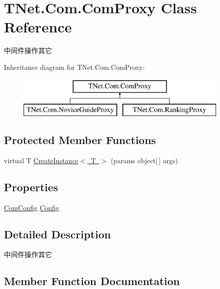 \hypertarget{class_t_net_1_1_com_1_1_com_proxy}{}\section{T\+Net.\+Com.\+Com\+Proxy Class Reference}
\label{class_t_net_1_1_com_1_1_com_proxy}


中间件操作其它  


Inheritance diagram for T\+Net.\+Com.\+Com\+Proxy\+:\begin{figure}[H]
\begin{center}
\leavevmode
\includegraphics[height=2.000000cm]{class_t_net_1_1_com_1_1_com_proxy}
\end{center}
\end{figure}
\subsection*{Protected Member Functions}
\begin{DoxyCompactItemize}
\item 
virtual T \mbox{\hyperlink{class_t_net_1_1_com_1_1_com_proxy_ae5fadb33c89dbc66db16f6ad156d64fb}{Create\+Instance$<$ T $>$}} (params object\mbox{[}$\,$\mbox{]} args)
\end{DoxyCompactItemize}
\subsection*{Properties}
\begin{DoxyCompactItemize}
\item 
\mbox{\hyperlink{class_t_net_1_1_com_1_1_com_config}{Com\+Config}} \mbox{\hyperlink{class_t_net_1_1_com_1_1_com_proxy_a42536aa6b4c1dbc50f6e7929c9937db5}{Config}}
\end{DoxyCompactItemize}


\subsection{Detailed Description}
中间件操作其它 



\subsection{Member Function Documentation}
\mbox{\label{class_t_net_1_1_com_1_1_com_proxy_ae5fadb33c89dbc66db16f6ad156d64fb}} 
